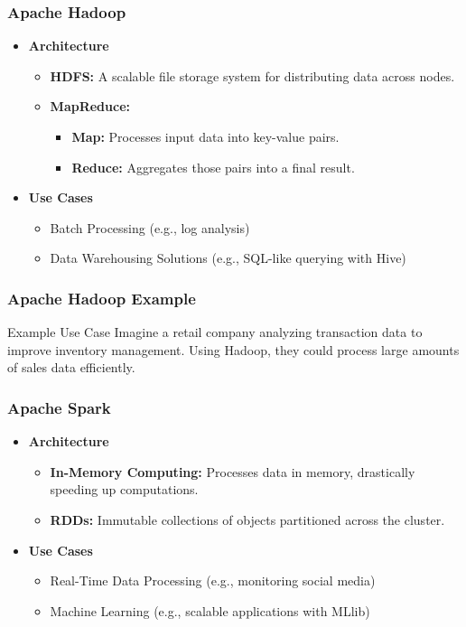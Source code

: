 \documentclass{beamer}
\begin{document}
\begin{frame}
    \frametitle{Apache Hadoop}
    \begin{itemize}
        \item \textbf{Architecture}
            \begin{itemize}
                \item \textbf{HDFS:} A scalable file storage system for distributing data across nodes.
                \item \textbf{MapReduce:} 
                    \begin{itemize}
                        \item \textbf{Map:} Processes input data into key-value pairs.
                        \item \textbf{Reduce:} Aggregates those pairs into a final result.
                    \end{itemize}
            \end{itemize}
        \item \textbf{Use Cases}
            \begin{itemize}
                \item Batch Processing (e.g., log analysis)
                \item Data Warehousing Solutions (e.g., SQL-like querying with Hive)
            \end{itemize}
    \end{itemize}
\end{frame}

\begin{frame}
    \frametitle{Apache Hadoop Example}
    \begin{block}{Example Use Case}
        Imagine a retail company analyzing transaction data to improve inventory management. Using Hadoop, they could process large amounts of sales data efficiently.
    \end{block}
\end{frame}

\begin{frame}
    \frametitle{Apache Spark}
    \begin{itemize}
        \item \textbf{Architecture}
            \begin{itemize}
                \item \textbf{In-Memory Computing:} Processes data in memory, drastically speeding up computations.
                \item \textbf{RDDs:} Immutable collections of objects partitioned across the cluster.
            \end{itemize}
        \item \textbf{Use Cases}
            \begin{itemize}
                \item Real-Time Data Processing (e.g., monitoring social media)
                \item Machine Learning (e.g., scalable applications with MLlib)
            \end{itemize}
    \end{itemize}
\end{frame}
\end{document}
